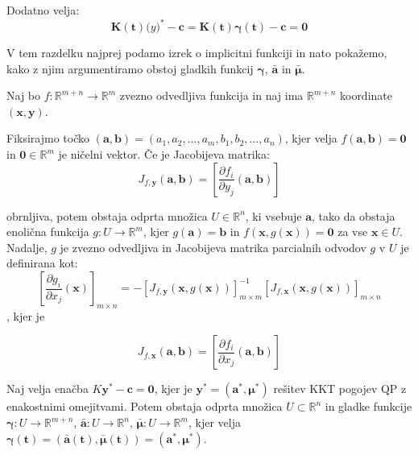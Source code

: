 \documentclass[mat2, tisk]{fmfdelo}
\newcommand{\aimplicit}{\bar{\mathbf{a}}}
\newcommand{\muimplicit}{\bar{\mathbf{\mu}}}
\newcommand{\yimplicit}{\mathbf{\gamma}}
\newcommand{\kmat}{\mathbf{K}}
\newcommand{\avec}{\mathbf{a}}
\newcommand{\tvec}{\mathbf{t}}
\newcommand{\muvec}{\boldsymbol{\mu}}
\begin{document}
Dodatno velja:
\begin{equation}
    \label{eq:equilibrium_implicit}
    \kmat(\tvec) \mathbf(y)^* - \mathbf{c} = \kmat(\tvec) \yimplicit(\tvec) - \mathbf{c} = \mathbf{0}
\end{equation}

V tem razdelku najprej podamo izrek o implicitni funkciji \cite{rudin1976principles} in nato pokažemo, kako z njim argumentiramo obstoj gladkih funkcij $\yimplicit$, $\aimplicit$ in $\muimplicit$.

\begin{izrek}
    Naj bo $f: \mathbb{R}^{m+n} \to \mathbb{R}^m$ zvezno odvedljiva funkcija in naj ima $\mathbb{R}^{m+n}$ koordinate $(\mathbf{x},\mathbf{y})$. 
    
    Fiksirajmo točko $(\mathbf{a}, \mathbf{b}) = (a_1, a_2, \ldots, a_m, b_1, b_2, \ldots, a_n)$, kjer velja $f(\mathbf{a},\mathbf{b}) = \mathbf{0}$ in $\mathbf{0} \in \mathbb{R}^m$ je ničelni vektor. Če je Jacobijeva matrika:
    \begin{equation}
        J_{f,\mathbf{y}}(\mathbf{a}, \mathbf{b}) = \left[ \frac{\partial f_i}{\partial y_j} (\mathbf{a},\mathbf{b})\right]
    \end{equation}

    obrnljiva, potem obstaja odprta množica $U \in \mathbb{R}^n$, ki vsebuje $\mathbf{a}$, tako da obstaja enolična funkcija $g:U \to \mathbb{R}^m$, kjer $g(\mathbf{a}) = \mathbf{b}$ in $f(\mathbf{x}, g(\mathbf{x})) = \mathbf{0}$ za vse $\mathbf{x} \in U$. Nadalje, $g$ je zvezno odvedljiva in Jacobijeva matrika parcialnih odvodov $g$ v $U$ je definirana kot:
    \begin{equation}
        \left[\frac{\partial g_i}{\partial x_j}(\mathbf{x})\right]_{m \times n}
= -\left[ J_{f, \mathbf{y}}(\mathbf{x}, g(\mathbf{x})) \right]^{-1}_{m \times m}
\left[ J_{f,\mathbf{x}}(\mathbf{x}, g(\mathbf{x})) \right]_{m \times n}
    \end{equation}, kjer je 

\begin{equation}
        J_{f,\mathbf{x}}(\mathbf{a}, \mathbf{b}) = \left[ \frac{\partial f_i}{\partial x_j} (\mathbf{a},\mathbf{b})\right]
    \end{equation}
\end{izrek}

\begin{izrek} 
Naj velja enačba $K\mathbf{y}^* - \mathbf{c} = \mathbf{0}$, kjer je $\mathbf{y}^* = (\mathbf{a}^*, \mathbf{\mu}^*)$ rešitev KKT pogojev QP z enakostnimi omejitvami. Potem obstaja odprta množica $U \subset \mathbb{R}^n$ in gladke funkcije $\yimplicit : U \to \mathbb{R}^{m+n}$, $\aimplicit : U \to \mathbb{R}^{n}$, $\muimplicit : U \to \mathbb{R}^{m}$, kjer velja $\yimplicit(\tvec) = (\aimplicit(\tvec), \muimplicit(\tvec)) = (\avec^*, \muvec^*)$.
\end{izrek}
\end{document}
